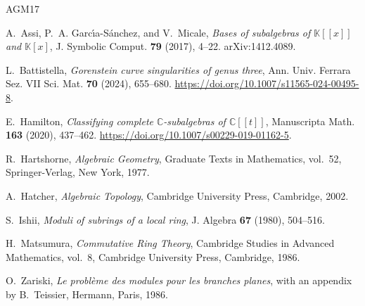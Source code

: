 \documentclass{amsart}
\theoremstyle{definition}
\theoremstyle{remark}
\numberwithin{equation}{section}
\begin{document}
\begin{thebibliography}{AGM17}

A.~Assi, P.~A. Garc\'{\i}a-S\'anchez, and V.~Micale, \emph{Bases of subalgebras of $\mathbb{K}[\![x]\!]$ and $\mathbb{K}[x]$}, J. Symbolic Comput. \textbf{79} (2017), 4--22. arXiv:1412.4089.

L.~Battistella, \emph{Gorenstein curve singularities of genus three}, Ann. Univ. Ferrara Sez. VII Sci. Mat. \textbf{70} (2024), 655--680. \url{https://doi.org/10.1007/s11565-024-00495-8}.

E.~Hamilton, \emph{Classifying complete $\mathbb{C}$-subalgebras of $\mathbb{C}[\![t]\!]$}, Manuscripta Math. \textbf{163} (2020), 437--462. \url{https://doi.org/10.1007/s00229-019-01162-5}.

R.~Hartshorne, \emph{Algebraic Geometry}, Graduate Texts in Mathematics, vol.~52, Springer-Verlag, New York, 1977.

A.~Hatcher, \emph{Algebraic Topology}, Cambridge University Press, Cambridge, 2002.

S.~Ishii, \emph{Moduli of subrings of a local ring}, J. Algebra \textbf{67} (1980), 504--516.

H.~Matsumura, \emph{Commutative Ring Theory}, Cambridge Studies in Advanced Mathematics, vol.~8, Cambridge University Press, Cambridge, 1986.

O.~Zariski, \emph{Le probl\`eme des modules pour les branches planes}, with an appendix by B.~Teissier, Hermann, Paris, 1986.

\end{thebibliography}
\end{document}
